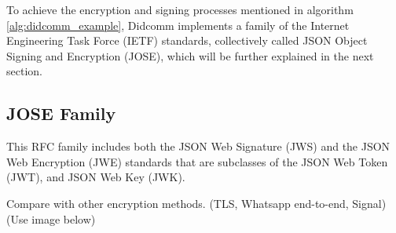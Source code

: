 To achieve the encryption and signing processes mentioned in algorithm \ref{alg:didcomm_example}, Didcomm implements a family of the Internet Engineering Task Force (IETF) standards, collectively called JSON Object Signing and Encryption (JOSE), which will be further explained in the next section. 

\subsection{JOSE Family}

This RFC family includes both the JSON Web Signature (JWS) and the JSON Web Encryption (JWE) standards that are subclasses of the JSON Web Token (JWT), and JSON Web Key (JWK).

Compare with other encryption methods. (TLS, Whatsapp end-to-end, Signal) (Use image below)
 